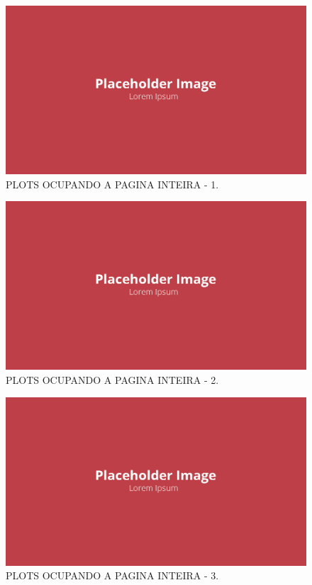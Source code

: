 \begin{figure}[!ht]
    \centering
    \includegraphics[width=.8\linewidth]{figuras/placeholder.png}
    \caption{PLOTS OCUPANDO A PAGINA INTEIRA - 1\cite{autor}.}
    \label{fig:placeholder}
\end{figure}

\begin{figure}[!ht]
    \centering
    \includegraphics[width=.8\linewidth]{figuras/placeholder.png}
    \caption{PLOTS OCUPANDO A PAGINA INTEIRA - 2\cite{autor}.}
    \label{fig:placeholder}
\end{figure}

\begin{figure}[!ht]
    \centering
    \includegraphics[width=.8\linewidth]{figuras/placeholder.png}
    \caption{PLOTS OCUPANDO A PAGINA INTEIRA - 3\cite{autor}.}
    \label{fig:placeholder}
\end{figure}

